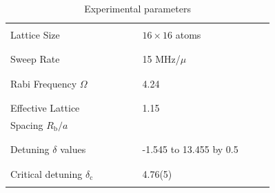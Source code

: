 \documentclass[twocolumn,
                showpacs,
                nofootinbib,
                nobibnotes,
                aps,
                superscriptaddress,
                amssymb,
                amsmath,
                floatfix,
                reprint,
                prx, 
                notitlepage,
                showkeys,
                10pt,
		]{revtex4-2}
\begin{document}
\begin{table}[h!]
    \centering
    \begin{tabular}{|m{0.4\linewidth}|m{0.4\linewidth}|}
    
        \hline
         & \\
        Lattice Size &  $16\times16$ atoms\\
         & \\
        \hline
         & \\
        Sweep Rate & 15 MHz/$\mu$\\
         & \\
        \hline
         & \\
        Rabi Frequency $\Omega$ & 4.24\\
          & \\
        \hline
         & \\
         Effective Lattice & 1.15\\
         Spacing $R_{\text{b}}/a$ & \\
          & \\
        \hline
         & \\
        Detuning $\delta$ values & -1.545 to 13.455 by 0.5 \\
          &  \\
        \hline
         & \\
        Critical detuning  $\delta_{\text{c}}$ &  4.76(5)\\
         & \\
        \hline
    \end{tabular}
    \caption{Experimental parameters}
    \label{tab:expparams}
\end{table}
\end{document}
